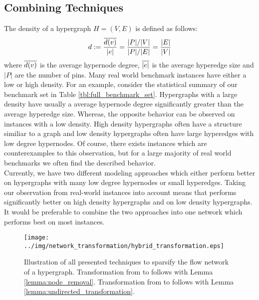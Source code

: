 \subsection{Combining Techniques}
\label{sec:hybrid_network}

The density of a hypergraph $H = (V,E)$ is defined as follows:
\[d := \frac{\overline{d(v)}}{|e|} = \frac{|P|/|V|}{|P|/|E|} = \frac{|E|}{|V|}\]
where $\overline{d(v)}$ is the average hypernode degree, $\overline{|e|}$ is the average hyperedge
size and $|P|$ are the number of pins. Many real world benchmark instances have either a low 
or high density. For an example, consider the statistical summary of our benchmark set in
Table \ref{tbl:full_benchmark_set}. Hypergraphs with a large density have usually a average
hypernode degree significantly greater than the average hyperedge size. Whereas, the opposite
behavior can be observed on instances with a low density. High density hypergraphs often have a structure
similiar to a graph and low density hypergraphs often have large hyperedges with low degree
hypernodes. Of course, there exists instances which are counterexamples to this observation, 
but for a large majority of real world benchmarks we often find the described behavior.\\
Currently, we have two different modeling approaches which either perform better on hypergraphs with
many low degree hypernodes or small hyperedges. Taking our observation from real-world instances 
into account means that  performs significantly better on high density hypergraphs
and  on low density hypergraphs. It would be preferable to combine 
the two approaches into one network which performs best on most instances. \\
\begin{figure}[ht!]
\centering
\texttt{[image: ../img/network\_transformation/hybrid\_transformation.eps]}
\caption{Illustration of all presented techniques to sparsify the flow network of a hypergraph.
         Transformation from  to  follows with Lemma \ref{lemma:node_removal}.
         Transformation from  to  follows with Lemma \ref{lemma:undirected_transformation}.}
\label{img:transformation_chain} 
\end{figure}

